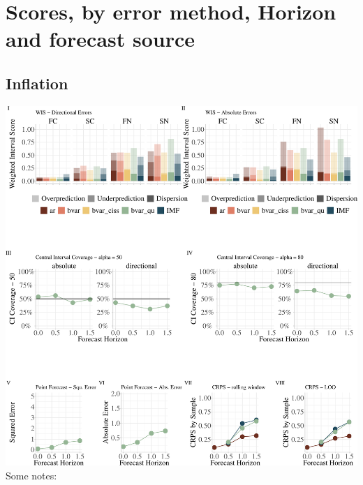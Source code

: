 \documentclass[
]{article}
\begin{document}
\hypertarget{scores-by-error-method-horizon-and-forecast-source}{%
\section{Scores, by error method, Horizon and forecast source}\label{scores-by-error-method-horizon-and-forecast-source}}

\hypertarget{inflation}{%
\subsection{Inflation}\label{inflation}}

\includegraphics{manuscript_files/figure-latex/overall_assessment_ew-1.pdf}
\newpage
Some notes:
\end{document}
